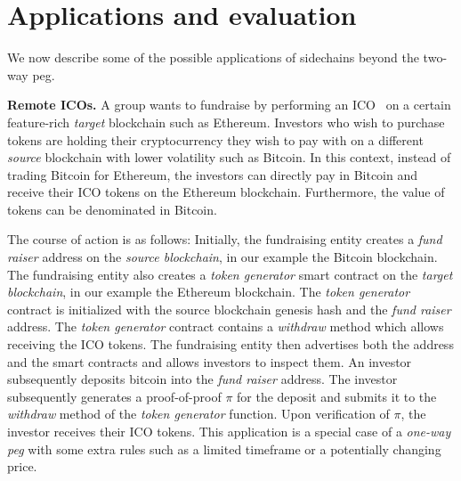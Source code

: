 \section{Applications and evaluation}

We now describe some of the possible applications of sidechains beyond the
two-way peg.

\noindent
\textbf{Remote ICOs. } A group wants to fundraise by performing an
ICO~\cite{ico} on a certain feature-rich \emph{target} blockchain such as
Ethereum. Investors who wish to purchase tokens are holding their cryptocurrency
they wish to pay with on a different \emph{source} blockchain with lower
volatility such as Bitcoin. In this context, instead of trading Bitcoin for
Ethereum, the investors can directly pay in Bitcoin and receive their ICO tokens
on the Ethereum blockchain. Furthermore, the value of tokens can be denominated
in Bitcoin.

The course of action is as follows: Initially, the fundraising entity creates a
\emph{fund raiser} address on the \emph{source blockchain}, in our example the
Bitcoin blockchain. The fundraising entity also creates a \emph{token generator}
smart contract on the \emph{target blockchain}, in our example the Ethereum
blockchain. The \emph{token generator} contract is initialized with the source
blockchain genesis hash and the \emph{fund raiser} address. The \emph{token
generator} contract contains a \emph{withdraw} method which allows receiving the
ICO tokens. The fundraising entity then advertises both the address and the
smart contracts and allows investors to inspect them. An investor subsequently
deposits bitcoin into the \emph{fund raiser} address. The investor subsequently
generates a proof-of-proof $\pi$ for the deposit and submits it to the
\emph{withdraw} method of the \emph{token generator} function. Upon verification
of $\pi$, the investor receives their ICO tokens. This application is a special
case of a \emph{one-way peg} with some extra rules such as a limited timeframe
or a potentially changing price.

